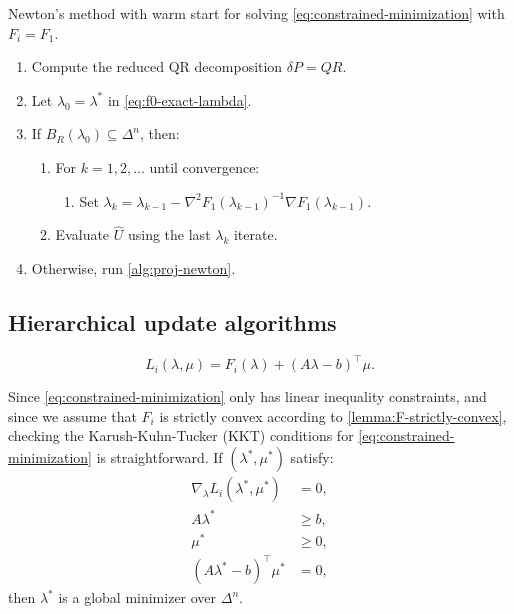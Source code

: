 \documentclass[eikonal.tex]{subfiles}
\begin{document}
\begin{algorithm}[H]
  \caption{Newton's method with warm start for solving
    \cref{eq:constrained-minimization} with
    $F_i = F_1$.}\label{alg:warm-start-newton}
  \begin{enumerate}[nolistsep]
  \item Compute the reduced QR decomposition $\delta P = QR$.
  \item Let $\lambda_0 = \lambda^*$ in \cref{eq:f0-exact-lambda}.
  \item If $B_R(\lambda_0) \subseteq \Delta^n$, then:
    \begin{enumerate}[nolistsep]
    \item For $k = 1, 2, \hdots$ until convergence:
      \begin{enumerate}
      \item Set
        $\lambda_k = \lambda_{k-1} - \nabla^2
        F_1(\lambda_{k-1})^{-1} \nabla
        F_1(\lambda_{k-1})$.
      \end{enumerate}
    \item Evaluate $\hat{U}$ using the last $\lambda_k$ iterate.
    \end{enumerate}
  \item Otherwise, run \cref{alg:proj-newton}.
  \end{enumerate}
\end{algorithm}

\subsection[Update algorithms]{Hierarchical update algorithms}

\begin{equation}
  L_i(\lambda, \mu) = F_i(\lambda) + {(A\lambda - b)}^\top \mu.
\end{equation}

Since \cref{eq:constrained-minimization} only has linear inequality
constraints, and since we assume that $F_i$ is strictly convex
according to \cref{lemma:F-strictly-convex}, checking the
Karush-Kuhn-Tucker (KKT) conditions for
\cref{eq:constrained-minimization} is straightforward. If
$(\lambda^*, \mu^*)$ satisfy:
\begin{equation}
  \label{eq:kkt}
  \begin{split}
    \nabla_\lambda L_i(\lambda^*, \mu^*) &= 0, \\
    A\lambda^* &\geq b, \\
    \mu^* &\geq 0, \\
    (A\lambda^* - b)^\top \mu^* &= 0,
  \end{split}
\end{equation}
then $\lambda^*$ is a global minimizer over $\Delta^n$.
\end{document}
